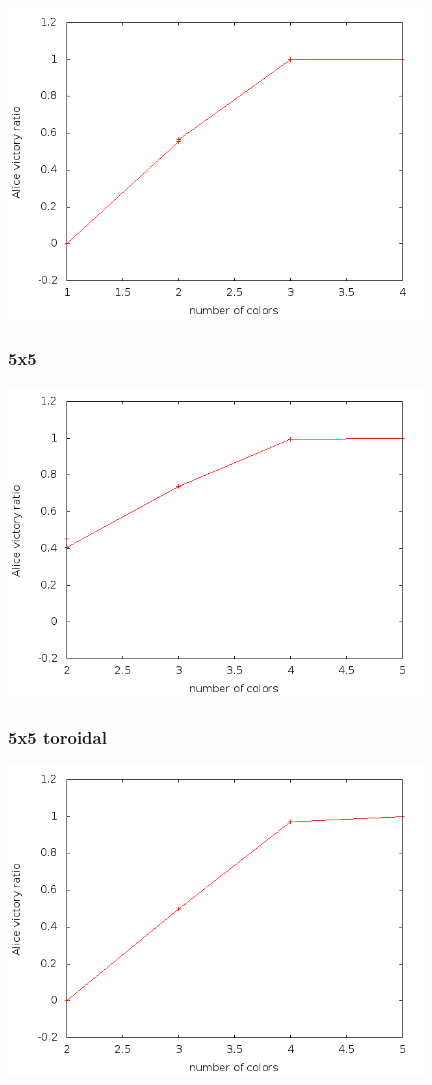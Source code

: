 \includegraphics[width=11cm]{resultats/grille25.png}

\subsubsection{5x5}

\includegraphics[width=11cm]{resultats/grille55.png}

\subsubsection{5x5 toroidal}

\includegraphics[width=11cm]{resultats/grilletor55.png}

